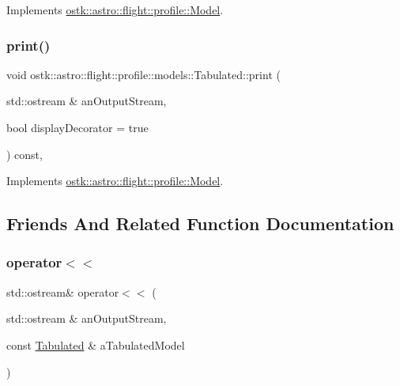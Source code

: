 Implements \hyperlink{classostk_1_1astro_1_1flight_1_1profile_1_1_model_a87f7ca747d79619e4b4bc04aa6a9252a}{ostk\+::astro\+::flight\+::profile\+::\+Model}.

\mbox{\label{classostk_1_1astro_1_1flight_1_1profile_1_1models_1_1_tabulated_a0e3d34c39a644279a9b958c3fd9bf730}} 
\subsubsection{\texorpdfstring{print()}{print()}}
{\footnotesize\ttfamily void ostk\+::astro\+::flight\+::profile\+::models\+::\+Tabulated\+::print (\begin{DoxyParamCaption}\item[{std\+::ostream \&}]{an\+Output\+Stream,  }\item[{bool}]{display\+Decorator = {\ttfamily true} }\end{DoxyParamCaption}) const\hspace{0.3cm}{\ttfamily [override]}, {\ttfamily [virtual]}}



Implements \hyperlink{classostk_1_1astro_1_1flight_1_1profile_1_1_model_ad9bb86b1869150e2bd970e9fa59ce36e}{ostk\+::astro\+::flight\+::profile\+::\+Model}.



\subsection{Friends And Related Function Documentation}
\mbox{\label{classostk_1_1astro_1_1flight_1_1profile_1_1models_1_1_tabulated_af2b779226be02822defbe40cf6d3c4b8}} 
\subsubsection{\texorpdfstring{operator$<$$<$}{operator<<}}
{\footnotesize\ttfamily std\+::ostream\& operator$<$$<$ (\begin{DoxyParamCaption}\item[{std\+::ostream \&}]{an\+Output\+Stream,  }\item[{const \hyperlink{classostk_1_1astro_1_1flight_1_1profile_1_1models_1_1_tabulated}{Tabulated} \&}]{a\+Tabulated\+Model }\end{DoxyParamCaption})\hspace{0.3cm}{\ttfamily [friend]}}



